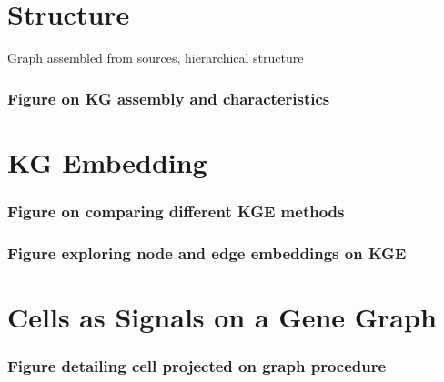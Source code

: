 
\section{Structure}

Graph assembled from sources, hierarchical structure

\subsubsection{Figure on KG assembly and characteristics}

\section{KG Embedding}

\subsubsection{Figure on comparing different KGE methods}

\subsubsection{Figure exploring node and edge embeddings on KGE}

\section{Cells as Signals on a Gene Graph}

\subsubsection{Figure detailing cell projected on graph procedure}

